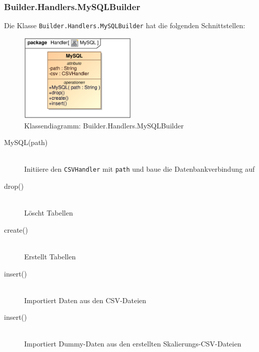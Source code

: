 \subsubsection{Builder.Handlers.MySQLBuilder}
Die Klasse \verb|Builder.Handlers.MySQLBuilder| hat die folgenden Schnittstellen:
\begin{figure}[H]
    \myfloatalign
    \includegraphics[width=0.5\textwidth]{gfx/MtGDeepAnalysis/MySQL.eps}
    \caption{Klassendiagramm: Builder.Handlers.MySQLBuilder}
    \label{fig:class:builder.handlers.mysqlbuilder}
\end{figure}

\begin{description}
    \item[MySQL(path)] \hfill \\
    Initiiere den \verb|CSVHandler| mit \verb|path| und baue die Datenbankverbindung auf
    
    \item[drop()] \hfill \\
       Löscht Tabellen
       
    \item[create()] \hfill \\
        Erstellt Tabellen
        
    \item[insert()] \hfill \\
        Importiert Daten aus den \ac{CSV}-Dateien
    
    \item[insert()] \hfill \\
        Importiert Dummy-Daten aus den erstellten Skalierungs-CSV-Dateien
\end{description}


